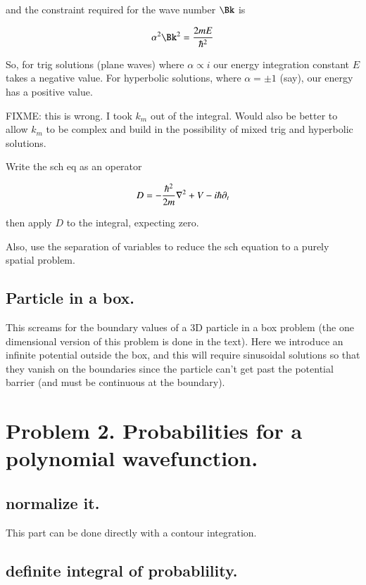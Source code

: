 \documentclass{article}
\begin{document}
and the constraint required for the wave number $\Bk$ is 

\begin{align*}
\alpha^2 \Bk^2 = \frac{2 m E }{\hbar^2}
\end{align*}

So, for trig solutions (plane waves) where $\alpha \propto i$ our energy integration constant $E$ takes a negative value.
For hyperbolic solutions, where $\alpha = \pm 1$ (say), our energy has a positive value.

FIXME: this is wrong.  I took $k_m$ out of the integral.  Would also be
better to allow $k_m$ to be complex and build in the possibility of 
mixed trig and hyperbolic solutions.

Write the sch eq as an operator

\begin{align*}
D = -\frac{\hbar^2}{2m}\nabla^2 + V -i\hbar\partial_t
\end{align*}

then apply $D$ to the integral, expecting zero.

Also, use the separation of variables to reduce the sch equation to a purely
spatial problem.

\subsection{ Particle in a box. }

This screams for the boundary values of a 3D particle in a box problem
(the one dimensional version of this problem is done in the text).
Here we introduce an infinite potential outside the
box, and this will require sinusoidal solutions so that they vanish on
the boundaries since the particle can't get past the potential
barrier (and must be continuous at the boundary).

\section{ Problem 2. Probabilities for a polynomial wavefunction. }

\subsection{ normalize it. }

This part can be done directly with a contour integration.

\subsection{ definite integral of probablility. }
\end{document}
